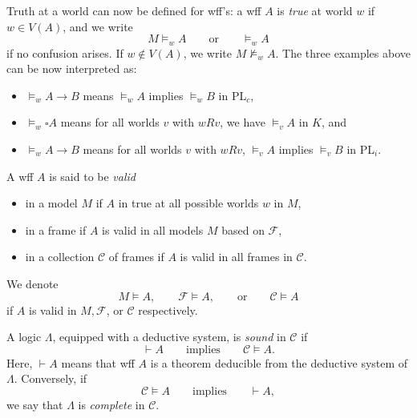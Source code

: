 \documentclass[12pt]{article}
\begin{document}
Truth at a world can now be defined for wff's: a wff $A$ is \emph{true} at world $w$ if $w\in V(A)$, and we write $$M \models_w A\qquad\mbox{or}\qquad \models_w A$$
if no confusion arises.  If $w\notin V(A)$, we write $M \not\models_w A$.  The three examples above can be now interpreted as:
\begin{itemize}
\item $\models_w A\to B$ means $\models_w A$ implies $\models_w B$ in PL$_c$, 
\item $\models_w \square A$ means for all worlds $v$ with $wRv$, we have $\models_v A$ in $K$, and
\item $\models_w A\to B$ means for all worlds $v$ with $wRv$, $\models_v A$ implies $\models_v B$ in PL$_i$.
\end{itemize}

A wff $A$ is said to be \emph{valid} 
\begin{itemize}
\item in a model $M$ if $A$ in true at all possible worlds $w$ in $M$,
\item in a frame if $A$ is valid in all models $M$ based on $\mathcal{F}$,
\item in a collection $\mathcal{C}$ of frames if $A$ is valid in all frames in $\mathcal{C}$.
\end{itemize}
We denote
$$M\models A, \qquad \mathcal{F} \models A, \qquad \mbox{or} \qquad \mathcal{C} \models A$$
if $A$ is valid in $M,\mathcal{F}$, or $\mathcal{C}$ respectively.

A logic $\Lambda$, equipped with a deductive system, is \emph{sound} in $\mathcal{C}$ if $$\vdash A \qquad \mbox{implies}\qquad \mathcal{C} \models A.$$  Here, $\vdash A$ means that wff $A$ is a theorem deducible from the deductive system of $\Lambda$.   Conversely, if $$\mathcal{C} \models A\qquad \mbox{implies} \qquad \vdash A,$$ we say that $\Lambda$ is \emph{complete} in $\mathcal{C}$.

\end{document}
